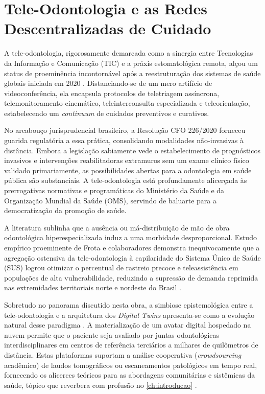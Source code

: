 \section{Tele-Odontologia e as Redes Descentralizadas de Cuidado}
\label{sec:teleodontologia}

A tele-odontologia, rigorosamente demarcada como a sinergia entre Tecnologias da Informação e Comunicação (TIC) e a práxis estomatológica remota, alçou um status de proeminência incontornável após a reestruturação dos sistemas de saúde globais iniciada em 2020 \cite{ijmi2026disability}. Distanciando-se de um mero artifício de videoconferência, ela encapsula protocolos de teletriagem assíncrona, telemonitoramento cinemático, teleinterconsulta especializada e teleorientação, estabelecendo um \textit{continuum} de cuidados preventivos e curativos.

No arcabouço jurisprudencial brasileiro, a Resolução CFO 226/2020 forneceu guarida regulatória a essa prática, consolidando modalidades não-invasivas à distância. Embora a legislação sabiamente vede o estabelecimento de prognósticos invasivos e intervenções reabilitadoras extramuros sem um exame clínico físico validado primariamente, as possibilidades abertas para a odontologia em saúde pública são substanciais. A tele-odontologia está profundamente alicerçada às prerrogativas normativas e programáticas do Ministério da Saúde e da Organização Mundial da Saúde (OMS), servindo de baluarte para a democratização da promoção de saúde.


A literatura sublinha que a ausência ou má-distribuição de mão de obra odontológica hiperespecializada induz a uma morbidade desproporcional. Estudo empírico proeminente de Frota e colaboradores demonstra inequivocamente que a agregação ostensiva da tele-odontologia à capilaridade do Sistema Único de Saúde (SUS) logrou otimizar o percentual de rastreio precoce e teleassistência em populações de alta vulnerabilidade, reduzindo a supressão de demanda reprimida nas extremidades territoriais norte e nordeste do Brasil \cite{frota2025sus, cuadros2023access}.

Sobretudo no panorama discutido nesta obra, a simbiose epistemológica entre a tele-odontologia e a arquitetura dos \textit{Digital Twins} apresenta-se como a evolução natural desse paradigma \cite{olawade2026advancing}. A materialização de um avatar digital hospedado na nuvem permite que o paciente seja avaliado por juntas odontológicas interdisciplinares em centros de referência terciários a milhares de quilômetros de distância. Estas plataformas suportam a análise cooperativa (\textit{crowdsourcing} acadêmico) de laudos tomográficos ou escaneamentos patológicos em tempo real, fornecendo os alicerces teóricos para as abordagens comunitárias e sistêmicas da saúde, tópico que reverbera com profusão no \autoref{ch:introducao} \cite{shen2024effectiveness}.
